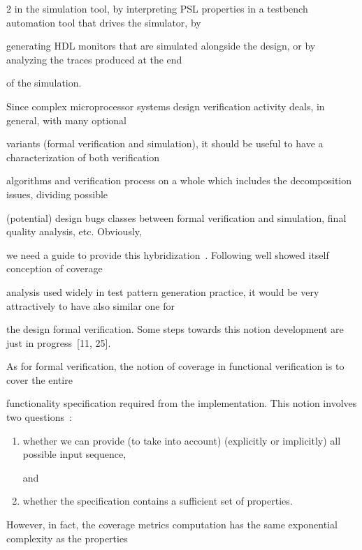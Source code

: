 \begin{multicols}{2}
in the simulation tool, by interpreting PSL properties in a testbench automation tool that drives the simulator, by


generating HDL monitors that are simulated alongside the design, or by analyzing the traces produced at the end


of the simulation.





Since complex microprocessor systems design veri\-fi\-cation activity deals, in general, with many optional


variants (formal verification and simulation), it should be useful to have a characterization of both verification


algorithms and verification process on a whole which includes the decomposition issues, dividing possible


(potential) design bugs classes between formal verification and simulation, final quality analysis, etc. Obviously,


we need a guide to provide this hybridization~\cite{3bar}. Following well showed itself conception of coverage


analysis used widely in test pattern generation practice, it would be very attractively to have also similar one for


the design formal verification. Some steps towards this notion development are just in progress~[11, 25]. 


As for formal verification, the notion of coverage in functional verification is to cover the entire


functionality specification required from the implementation. This notion involves two questions~\cite{25bar}:


    \begin{enumerate}[(1)]


\item whether we can provide (to take into account) (explicitly or implicitly) all possible input sequence,


and


\item whether the specification contains a sufficient set of properties.


\end{enumerate}





    However, in fact, the coverage metrics computation has the same exponential complexity as the properties



\end{multicols}
